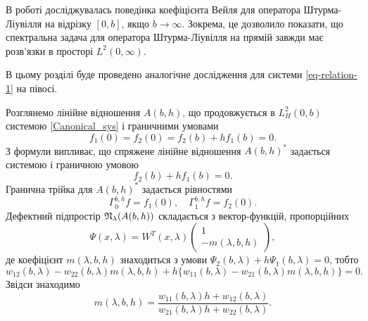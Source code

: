 В роботі \cite{Weyl2010} досліджувалась поведінка коефіцієнта Вейля для оператора Штурма-Ліувілля на відрізку $[0,b]$, якщо $b\to\infty$. Зокрема, це дозволило показати, що спектральна задача для оператора Штурма-Ліувілля на прямій завжди має розв'язки в просторі $L^2(0,\infty)$.

В цьому розділі буде проведено аналогічне дослідження для системи \eqref{eq-relation-1} на півосі.

Розглянемо лінійне відношення $A(b,h)$, що продовжується в $L^2_H(0,b)$ системою \eqref{Canonical_sys} і граничними умовами
\begin{equation}\label{eq-4.10}
	f_1(0) = f_2(0) = f_2(b) + hf_1(b) = 0.
\end{equation}
З формули
випливає, що спряжене лінійне відношення $A(b,h)^*$ задається системою і граничною умовою
\begin{equation}\label{eq-4.11}
	f_2(b) + hf_1(b) = 0.
\end{equation}
Гранична трійка для $A(b,h)^*$ задається рівностями
\begin{equation}\label{eq-4.12}
	\Gamma^{b,h}_0 f = f_1(0),\quad \Gamma_1^{b,h} f = f_2(0).
\end{equation}
Дефектний підпростір $\mathfrak{N}_\lambda(A(b,h))$ складається з вектор-функцій, пропорційних
\begin{equation}\label{eq-4.13}
	\Psi(x,\lambda) = W^T(x,\lambda)
	\begin{pmatrix}
		1 \\ -m(\lambda,b,h)
	\end{pmatrix},
\end{equation}
де коефіцієнт $m(\lambda,b,h)$ знаходиться з умови $\Psi_2(b,\lambda) + h\Psi_1(b,\lambda) = 0$, тобто
\begin{equation*}
	w_{12}(b,\lambda) - w_{22}(b,\lambda)m(\lambda,b,h) + h\{w_{11}(b,\lambda) - w_{21}(b,\lambda)m(\lambda,b,h) \} = 0.
\end{equation*}
Звідси знаходимо
\begin{equation}\label{eq-4.14}
	m(\lambda,b,h) = \frac{w_{11}(b,\lambda)h + w_{12}(b,\lambda)}{w_{21}(b,\lambda)h + w_{22}(b,\lambda)}.
\end{equation}

